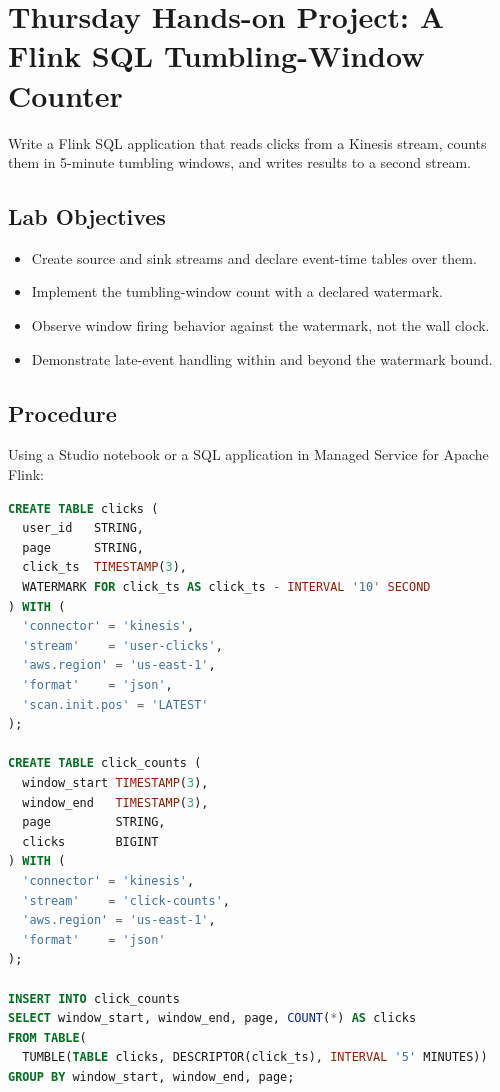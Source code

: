\section{Thursday Hands-on Project: A Flink SQL Tumbling-Window Counter}
Write a Flink SQL application that reads clicks from a Kinesis stream, counts them in 5-minute tumbling windows, and writes results to a second stream.

\subsection*{Lab Objectives}
\begin{itemize}
    \item Create source and sink streams and declare event-time tables over them.
    \item Implement the tumbling-window count with a declared watermark.
    \item Observe window firing behavior against the watermark, not the wall clock.
    \item Demonstrate late-event handling within and beyond the watermark bound.
\end{itemize}

\subsection*{Procedure}
Using a Studio notebook or a SQL application in Managed Service for Apache Flink:

\begin{lstlisting}[language=SQL,caption={Tumbling-window click counter in Flink SQL.},label={lst:ch15-tumble}]
CREATE TABLE clicks (
  user_id   STRING,
  page      STRING,
  click_ts  TIMESTAMP(3),
  WATERMARK FOR click_ts AS click_ts - INTERVAL '10' SECOND
) WITH (
  'connector' = 'kinesis',
  'stream'    = 'user-clicks',
  'aws.region' = 'us-east-1',
  'format'    = 'json',
  'scan.init.pos' = 'LATEST'
);

CREATE TABLE click_counts (
  window_start TIMESTAMP(3),
  window_end   TIMESTAMP(3),
  page         STRING,
  clicks       BIGINT
) WITH (
  'connector' = 'kinesis',
  'stream'    = 'click-counts',
  'aws.region' = 'us-east-1',
  'format'    = 'json'
);

INSERT INTO click_counts
SELECT window_start, window_end, page, COUNT(*) AS clicks
FROM TABLE(
  TUMBLE(TABLE clicks, DESCRIPTOR(click_ts), INTERVAL '5' MINUTES))
GROUP BY window_start, window_end, page;
\end{lstlisting}

